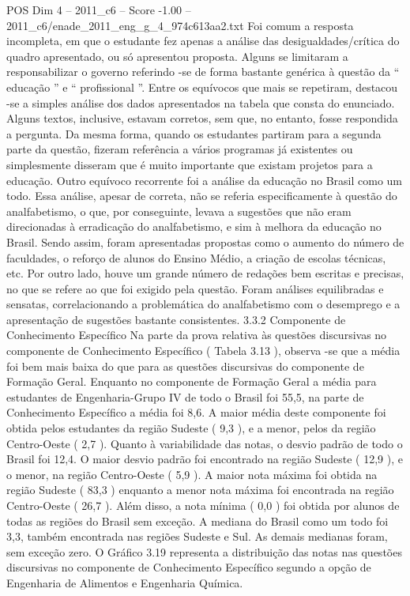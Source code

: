 \begin{textsample}{POS Dim 4 – 2011\_c6 – Score -1.00 – 2011\_c6/enade\_2011\_eng\_g\_4\_974c613aa2.txt}
Foi comum a resposta incompleta, em que o estudante fez apenas a análise das desigualdades/crítica do quadro apresentado, ou só apresentou proposta.
Alguns se limitaram a responsabilizar o governo referindo -se de forma bastante genérica à questão da “ educação ” e “ profissional ”.
Entre os equívocos que mais se repetiram, destacou -se a simples análise dos dados apresentados na tabela que consta do enunciado.
Alguns textos, inclusive, estavam corretos, sem que, no entanto, fosse respondida a pergunta.
Da mesma forma, quando os estudantes partiram para a segunda parte da questão, fizeram referência a vários programas já existentes ou simplesmente disseram que é muito importante que existam projetos para a educação.
Outro equívoco recorrente foi a análise da educação no Brasil como um todo.
Essa análise, apesar de correta, não se referia especificamente à questão do analfabetismo, o que, por conseguinte, levava a sugestões que não eram direcionadas à erradicação do analfabetismo, e sim à melhora da educação no Brasil.
Sendo assim, foram apresentadas propostas como o aumento do número de faculdades, o reforço de alunos do Ensino Médio, a criação de escolas técnicas, etc.
Por outro lado, houve um grande número de redações bem escritas e precisas, no que se refere ao que foi exigido pela questão.
Foram análises equilibradas e sensatas, correlacionando a problemática do analfabetismo com o desemprego e a apresentação de sugestões bastante consistentes. 3.3.2 Componente de Conhecimento Específico Na parte da prova relativa às questões discursivas no componente de Conhecimento Específico ( Tabela 3.13 ), observa -se que a média foi bem mais baixa do que para as questões discursivas do componente de Formação Geral.
Enquanto no componente de Formação Geral a média para estudantes de Engenharia-Grupo IV de todo o Brasil foi 55,5, na parte de Conhecimento Específico a média foi 8,6.
A maior média deste componente foi obtida pelos estudantes da região Sudeste ( 9,3 ), e a menor, pelos da região Centro-Oeste ( 2,7 ).
Quanto à variabilidade das notas, o desvio padrão de todo o Brasil foi 12,4.
O maior desvio padrão foi encontrado na região Sudeste ( 12,9 ), e o menor, na região Centro-Oeste ( 5,9 ).
A maior nota máxima foi obtida na região Sudeste ( 83,3 ) enquanto a menor nota máxima foi encontrada na região Centro-Oeste ( 26,7 ).
Além disso, a nota mínima ( 0,0 ) foi obtida por alunos de todas as regiões do Brasil sem exceção.
A mediana do Brasil como um todo foi 3,3, também encontrada nas regiões Sudeste e Sul.
As demais medianas foram, sem exceção zero.
O Gráfico 3.19 representa a distribuição das notas nas questões discursivas no componente de Conhecimento Específico segundo a opção de Engenharia de Alimentos e Engenharia Química.

\end{textsample}
